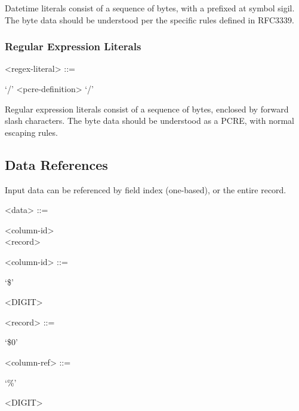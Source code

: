 Datetime literals consist of a sequence of bytes, with a prefixed at
symbol sigil. The byte data should be understood per the specific rules
defined in RFC3339\cite{RFC3339}.

\subsubsection{Regular Expression Literals}

\begin{grammar}
  <regex-literal> ::= \begin{syntdiag}
    `/'
    <pcre-definition>
    `/'
  \end{syntdiag}
\end{grammar}

Regular expression literals consist of a sequence of bytes, enclosed by
forward slash characters. The byte data should be understood as a PCRE,
with normal escaping rules.

\subsection{Data References}

Input data can be referenced by field index (one-based), or the entire
record.

\begin{grammar}
  <data> ::= \begin{syntdiag}
    \begin{stack}
      <column-id> \\
      <record>
    \end{stack}
  \end{syntdiag}

  <column-id> ::= \begin{syntdiag}
    `\$'
    \begin{rep}
      <DIGIT>
    \end{rep}
  \end{syntdiag}

  <record> ::= \begin{syntdiag}
    `\$0'
  \end{syntdiag}

  <column-ref> ::= \begin{syntdiag}
    `\%'
    \begin{rep}
      <DIGIT>
    \end{rep}
  \end{syntdiag}
\end{grammar}

